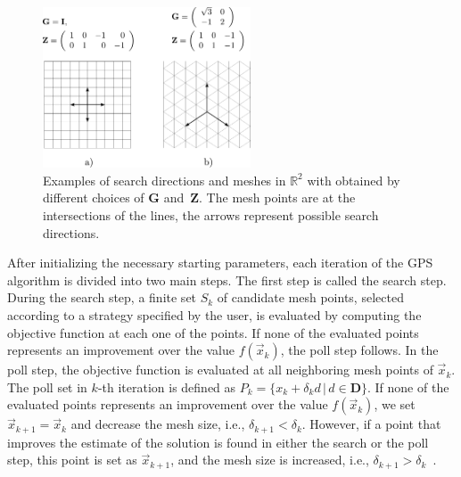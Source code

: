 \begin{figure}[H]
	\centering
	\includegraphics[width=0.55\textwidth]{figures/gps.pdf}
	\caption{Examples of search directions and meshes in $\mathbb{R}^2$ with
		obtained by different choices of $\mathbf{G}$ and~$\mathbf{Z}$. The mesh points
		are at the intersections of the lines, the arrows represent possible search directions.}
	\label{fig:gps}
\end{figure}


After initializing the necessary starting parameters, each iteration of the GPS algorithm is divided into two main steps. The first step is called the search step. During the search step, a finite set $S_k$ of candidate mesh points, selected according to a strategy specified by the user, is evaluated by computing the objective function at each one of the points. If none of the evaluated points represents an improvement over the value $ f(\vec{x}_k) $, the poll step follows. In the poll step, the objective function is evaluated at all neighboring mesh points of $ \vec{x}_k $. The poll set in $k$-th iteration is defined as $P_k = \{x_k + \delta_k d \, | \, d \in \mathbf{D}\}$. If none of the evaluated points represents an improvement over the value $ f(\vec{x}_k) $, we set $ \vec{x}_{k+1} = \vec{x}_k $ and decrease the mesh size, i.e., $ \delta_{k+1} < \delta_k $. However, if a point that improves the estimate of the solution is found in either the search or the poll step, this point is set as $ \vec{x}_{k+1} $, and the mesh size is increased, i.e., $ \delta_{k+1} > \delta_k $~\cite{BBO-textbook, Audet2002}.

